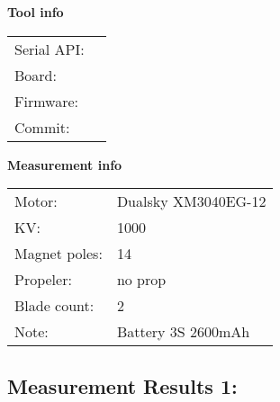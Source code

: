 \documentclass[10pt]{article}
\begin{document}
\noindent
{\large \bf Tool info}
\vspace{3mm}

\noindent
\begin{tabular}{ll}
Serial API:  & \\ 
Board:       & \\ 
Firmware:    & \\ 
Commit:      & 
\end{tabular}
\vspace{3mm}

\noindent
{\large \bf Measurement info}
\vspace{3mm}

\noindent
\begin{tabular}{ll}
Motor:        & Dualsky XM3040EG-12\\ 
KV:           & 1000\\ 
Magnet poles: & 14\\ 
Propeler:     & no prop\\ 
Blade count:  & 2\\ 
Note:         & Battery 3S 2600mAh
\end{tabular}

\vspace{3mm}


\subsection*{\large \bf Measurement Results 1:}
\end{document}
